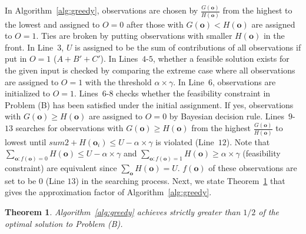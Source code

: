 \documentclass[conference]{IEEEtran}
\newtheorem{theorem}{Theorem}[section]
\begin{document}
In Algorithm~\ref{alg:greedy}, observations are chosen by $\frac{G(\boldsymbol{o})}{H(\boldsymbol{o})}$ from the highest to the lowest and assigned to $O=0$ after those with $G(\boldsymbol{o})< H(\boldsymbol{o})$ are assigned to $O=1$. Ties are broken by putting observations with smaller $H(\boldsymbol{o})$ in the front. In Line~$3$, $U$ is assigned to be the sum of contributions of all observations if put in $O=1$ ($A+B'+C'$). In Lines~$4$-$5$, whether a feasible solution exists for the given input is checked by comparing the extreme case where all observations are assigned to $O=1$ with the threshold $\alpha \times \gamma$. In Line~$6$, observations are initialized to $O=1$. Lines~$6$-$8$ checks whether the feasibility constraint in Problem (B) has been satisfied under the initial assignment. If yes, observations with $G(\boldsymbol{o})\ge H(\boldsymbol{o})$ are assigned to $O=0$ by Bayesian decision rule. Lines~$9$-$13$ searches for observations with $G(\boldsymbol{o})\ge H(\boldsymbol{o})$ from the highest $\frac{G(\boldsymbol{o})}{H(\boldsymbol{o})}$ to lowest until $sum2 +H(\boldsymbol{o}_i)\le U-\alpha  \times \gamma$ is violated (Line~$12$). Note that $\sum\limits_{\boldsymbol{o}:f(\boldsymbol{o})=0}{H(\boldsymbol{o})}\le U-\alpha \times \gamma$ and $\sum\limits_{\boldsymbol{o}:f(\boldsymbol{o})=1}{H(\boldsymbol{o})}\ge \alpha \times \gamma$ (feasibility constraint) are equivalent since $\sum\limits_{\boldsymbol{o}}{H(\boldsymbol{o})}=U$. $f(\boldsymbol{o})$ of these observations are set to be $0$ (Line $13$) in the searching process. Next, we state Theorem~\ref{thm:greedy} that gives the approximation factor of Algorithm~\ref{alg:greedy}.

\begin{theorem}
\label{thm:greedy}
Algorithm~\ref{alg:greedy} achieves strictly greater than $1/2$ of the optimal solution to Problem (B).
\end{theorem}
\end{document}
